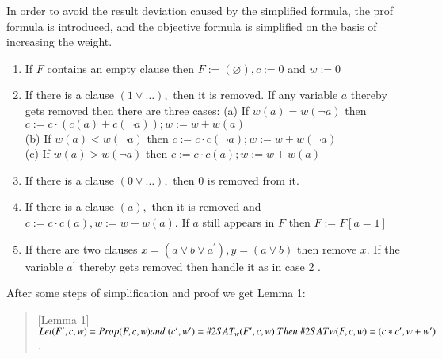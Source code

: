 \documentclass{sigchi}
\begin{document}
In order to avoid the result deviation caused by the simplified formula, the prof formula is introduced, and the objective formula is simplified on the basis of increasing the weight.
\begin{enumerate}
	\item If $F$ contains an empty clause then $F:=(\varnothing), c:=0$ and $w:=0$
	\item If there is a clause $(1 \vee \ldots),$ then it is removed. If any variable $a$ thereby gets removed then there are three cases:
	(a) If $w(a)=w(\neg a)$ then $c:=c \cdot(c(a)+c(\neg a)) ; w:=w+w(a)$\\
	(b) If $w(a)<w(\neg a)$ then $c:=c \cdot c(\neg a) ; w:=w+w(\neg a)$\\
	(c) If $w(a)>w(\neg a)$ then $c:=c \cdot c(a) ; w:=w+w(a)$
	\item If there is a clause $(0 \vee \ldots),$ then 0 is removed from it.
	\item If there is a clause $(a),$ then it is removed and $c:=c \cdot c(a), w:=w+w(a) .$ If $a$ still appears in $F$ then $F:=F[a=1]$
	\item If there are two clauses $x=\left(a \vee b \vee a^{\prime}\right), y=(a \vee b)$ then remove $x$. If the variable $a^{\prime}$ thereby gets removed then handle it as in case 2 .
\end{enumerate}
After some steps of simplification and proof we get Lemma 1:
\begin{quote}[Lemma 1]
	$Let({F}',c,w)=Prop(F,c,w)\\and\;({c}',{w}')=\#2SAT_{w}({F}',c,w).\\
	Then\; \#2SATw(F ,c,w)=(c*{c}',w+{w}')$.
\end{quote}
\end{document}
